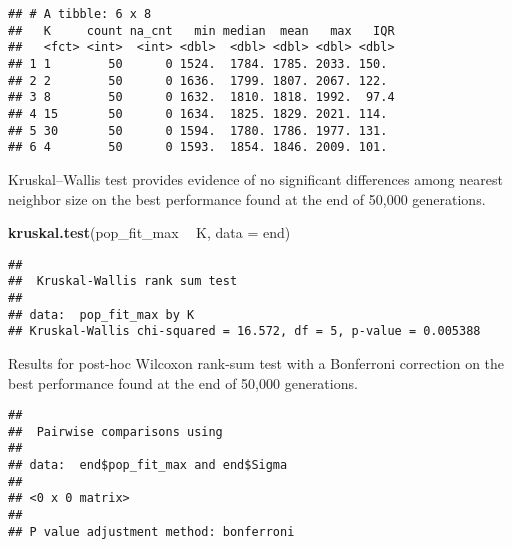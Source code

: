 \documentclass[]{book}
\newenvironment{Shaded}{\begin{snugshade}}{\end{snugshade}}
\newcommand{\DataTypeTok}[1]{\textcolor[rgb]{0.13,0.29,0.53}{#1}}
\newcommand{\KeywordTok}[1]{\textcolor[rgb]{0.13,0.29,0.53}{\textbf{#1}}}
\newcommand{\NormalTok}[1]{#1}
\newcommand{\OperatorTok}[1]{\textcolor[rgb]{0.81,0.36,0.00}{\textbf{#1}}}
\newcommand{\OtherTok}[1]{\textcolor[rgb]{0.56,0.35,0.01}{#1}}
\newcommand{\StringTok}[1]{\textcolor[rgb]{0.31,0.60,0.02}{#1}}
\begin{document}
\begin{verbatim}
## # A tibble: 6 x 8
##   K     count na_cnt   min median  mean   max   IQR
##   <fct> <int>  <int> <dbl>  <dbl> <dbl> <dbl> <dbl>
## 1 1        50      0 1524.  1784. 1785. 2033. 150. 
## 2 2        50      0 1636.  1799. 1807. 2067. 122. 
## 3 8        50      0 1632.  1810. 1818. 1992.  97.4
## 4 15       50      0 1634.  1825. 1829. 2021. 114. 
## 5 30       50      0 1594.  1780. 1786. 1977. 131. 
## 6 4        50      0 1593.  1854. 1846. 2009. 101.
\end{verbatim}

Kruskal--Wallis test provides evidence of no significant differences among nearest neighbor size on the best performance found at the end of 50,000 generations.

\begin{Shaded}
\begin{Highlighting}[]
\KeywordTok{kruskal.test}\NormalTok{(pop_fit_max }\OperatorTok{~}\StringTok{ }\NormalTok{K, }\DataTypeTok{data =}\NormalTok{ end)}
\end{Highlighting}
\end{Shaded}

\begin{verbatim}
## 
##  Kruskal-Wallis rank sum test
## 
## data:  pop_fit_max by K
## Kruskal-Wallis chi-squared = 16.572, df = 5, p-value = 0.005388
\end{verbatim}

Results for post-hoc Wilcoxon rank-sum test with a Bonferroni correction on the best performance found at the end of 50,000 generations.

\begin{Shaded}
\end{Shaded}

\begin{verbatim}
## 
##  Pairwise comparisons using 
## 
## data:  end$pop_fit_max and end$Sigma 
## 
## <0 x 0 matrix>
## 
## P value adjustment method: bonferroni
\end{verbatim}
\end{document}
